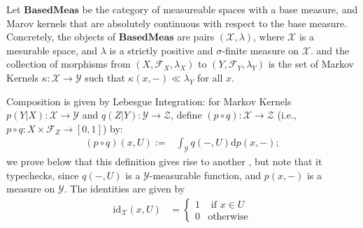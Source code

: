 \documentclass[twoside]{article} %
\theoremstyle{plain}
\theoremstyle{definition}
\newcommand{\BaseMeas}{\mathbf{BasedMeas}}
\begin{document}
    \begin{defn}
        Let $\BaseMeas$ be the category of measureable spaces with a base measure, and Marov kernels that are absolutely continuous with respect to the base measure.
        Concretely,
        the objects of $\BaseMeas$ are pairs $(\mathcal X, \lambda)$, where $\mathcal X$ is a mesurable space, and $\lambda$ is a strictly positive and $\sigma$-finite measure on $\mathcal X$.
        and the collection of morphisms from 
        $(X,\mathcal F_X, \lambda_X)$ to $(Y, \mathcal F_Y, \lambda_Y)$ is the 
        set of Markov Kernels $\kappa : \mathcal X \to \mathcal Y$
        such that 
        $\kappa(x,-) \ll \lambda_Y$ for all $x$.        
        
        Composition is given by Lebesgue Integration: for Markov Kernels $p(Y|X) : \mathcal X \to \mathcal Y$ and $q(Z|Y) : \mathcal Y \to \mathcal Z$, define
        $(p \circ q) : \mathcal X \to \mathcal Z$  (i.e., $p \circ q : X \times \mathcal F_Z \to [0,1]$) by:
        \begin{align*}
            (p\circ q)(x, U) :=& \int_{\mathcal Y}
                q(-, U)
                \mathrm d p(x,-);
        \end{align*}
        we prove below that this definition gives rise to another , but note that it typechecks, since $q(-,U)$ is a $\mathcal Y$-measurable function, and $p(x,-)$ is a measure on $\mathcal Y$. 
        The identities are given by
        \begin{align*}
        \mathrm{id}_{\mathcal X}(x, U) &= \begin{cases}
                1 & \text{ if }x \in U \\ 0 & \text{otherwise}
            \end{cases}
        \end{align*}
    \end{defn}
    
\end{document}
